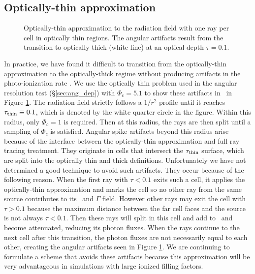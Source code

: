\documentclass[useAMS,usenatbib,a4paper]{mn2e}
\begin{document}
\subsection{Optically-thin approximation}

\begin{figure}
  \caption{\label{fig:rayopt} Optically-thin approximation to the
    radiation field with one ray per cell in optically thin regions.
    The angular artifacts result from the transition to optically
    thick (white line) at an optical depth $\tau = 0.1$.}
\end{figure}

In practice, we have found it difficult to transition from the
optically-thin approximation to the optically-thick regime without
producing artifacts in the photo-ionization rate \kph.  We use the
optically thin problem used in the angular resolution test
(\S\ref{sec:ang_dep}) with $\Phi_c = 5.1$ to show these artifacts in
\kph~in Figure \ref{fig:rayopt}.  The radiation field strictly follows
a $1/r^2$ profile until it reaches $\tau_{\rm thin} \equiv 0.1$, which
is denoted by the white quarter circle in the figure.  Within this
radius, only $\Phi_c = 1$ is required.  Then at this radius, the rays
are then split until a sampling of $\Phi_c$ is satisfied.  Angular
spike artifacts beyond this radius arise because of the interface
between the optically-thin approximation and full ray tracing
treatment.  They originate in cells that intersect the $\tau_{\rm
  thin}$ surface, which are split into the optically thin and thick
definitions.  Unfortunately we have not determined a good technique to
avoid such artifacts.  They occur because of the following reason.
When the first ray with $\tau < 0.1$ exits such a cell, it applies the
optically-thin approximation and marks the cell so no other ray from
the same source contributes to its \kph~and $\Gamma$ field.  However
other rays may exit the cell with $\tau > 0.1$ because the maximum
distance between the far cell faces and the source is not always $\tau
< 0.1$.  Then these rays will split in this cell and add to \kph~and
become attenuated, reducing its photon fluxes.  When the rays continue
to the next cell after this transition, the photon fluxes are not
necessarily equal to each other, creating the angular artifacts seen
in Figure \ref{fig:rayopt}.  We are continuing to formulate a scheme
that avoids these artifacts because this approximation will be very
advantageous in simulations with large ionized filling factors.
\end{document}
